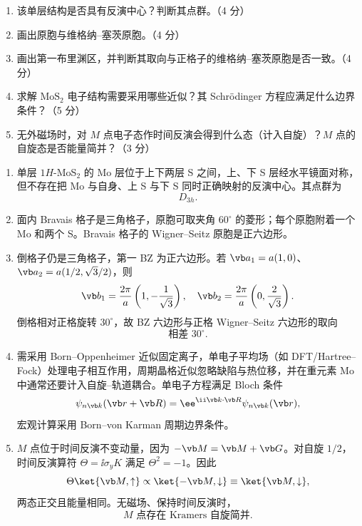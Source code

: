 \begin{question}[20 分]
\begin{center}
\end{center}
\begin{enumerate}
  \item 该单层结构是否具有反演中心？判断其点群。（4 分）
  \item 画出原胞与维格纳--塞茨原胞。（4 分）
  \item 画出第一布里渊区，并判断其取向与正格子的维格纳--塞茨原胞是否一致。（4 分）
  \item 求解 $\mathrm{MoS_2}$ 电子结构需要采用哪些近似？其 Schrödinger 方程应满足什么边界条件？（5 分）
  \item 无外磁场时，对 $M$ 点电子态作时间反演会得到什么态（计入自旋）？$M$ 点的自旋态是否能量简并？（3 分）
\end{enumerate}


\begin{solution}
\begin{enumerate}
  \item 单层 $1H$-MoS$_2$ 的 Mo 层位于上下两层 S 之间，上、下 S 层经水平镜面对称，但不存在把 Mo 与自身、上 S 与下 S 同时正确映射的反演中心。其点群为
  \[
    \boxed{D_{3h}.}
  \]
  \item 面内 Bravais 格子是三角格子，原胞可取夹角 $60^\circ$ 的菱形；每个原胞附着一个 Mo 和两个 S。Bravais 格子的 Wigner--Seitz 原胞是正六边形。
  \item 倒格子仍是三角格子，第一 BZ 为正六边形。若
  $\vb a_1=a(1,0)$、$\vb a_2=a(1/2,\sqrt3/2)$，则
  \[
    \vb b_1=\frac{2\pi}{a}\left(1,-\frac1{\sqrt3}\right),
    \quad
    \vb b_2=\frac{2\pi}{a}\left(0,\frac2{\sqrt3}\right).
  \]
  倒格相对正格旋转 $30^\circ$，故 BZ 六边形与正格 Wigner--Seitz 六边形的取向
  \[
    \boxed{\text{相差 }30^\circ.}
  \]
  \item 需采用 Born--Oppenheimer 近似固定离子，单电子平均场（如 DFT/Hartree--Fock）处理电子相互作用，周期晶格近似忽略缺陷与热位移，并在重元素 Mo 中通常还要计入自旋--轨道耦合。单电子方程满足 Bloch 条件
  \[
    \psi_{n\vb k}(\vb r+\vb R)=
    \ee^{\ii\vb k\cdot\vb R}\psi_{n\vb k}(\vb r),
  \]
  宏观计算采用 Born--von Karman 周期边界条件。
  \item $M$ 点位于时间反演不变动量，因为
  $-\vb M=\vb M+\vb G$。对自旋 $1/2$，时间反演算符
  $\Theta=\ii\sigma_yK$ 满足 $\Theta^2=-1$。因此
  \[
    \Theta\ket{\vb M,\uparrow}
    \propto\ket{-\vb M,\downarrow}
    \equiv\ket{\vb M,\downarrow},
  \]
  两态正交且能量相同。无磁场、保持时间反演时，
  \[
    \boxed{M\text{ 点存在 Kramers 自旋简并}.}
  \]
\end{enumerate}
\end{solution}
\end{question}

